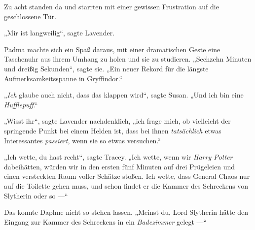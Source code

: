 Zu acht standen da und starrten mit einer gewissen Frustration auf die geschlossene Tür.

„Mir ist langweilig“, sagte Lavender.

Padma machte sich ein Spaß daraus, mit einer dramatischen Geste eine Taschenuhr aus ihrem Umhang zu holen und sie zu studieren.
„Sechzehn Minuten und dreißig Sekunden“, sagte sie.
„Ein neuer Rekord für die längste Aufmerksamkeitsspanne in Gryffindor.“

„\emph{Ich} glaube auch nicht, dass das klappen wird“, sagte Susan.
„Und ich bin eine \emph{Hufflepuff}.“

„Wisst ihr“, sagte Lavender nachdenklich, „ich frage mich, ob vielleicht der springende Punkt bei einem Helden ist, dass bei ihnen \emph{tatsächlich} etwas Interessantes \emph{passiert}, wenn sie so etwas versuchen.“

„Ich wette, du hast recht“, sagte Tracey.
„Ich wette, wenn wir \emph{Harry Potter} dabeihätten, würden wir in den ersten fünf Minuten auf drei Prügeleien und einen versteckten Raum voller Schätze stoßen. Ich wette, dass General Chaos nur auf die Toilette gehen muss, und schon findet er die Kammer des Schreckens von Slytherin oder so —“

Das konnte Daphne nicht so stehen lassen.
„Meinst du, Lord Slytherin hätte den Eingang zur Kammer des Schreckens in ein \emph{Badezimmer} gelegt —“

